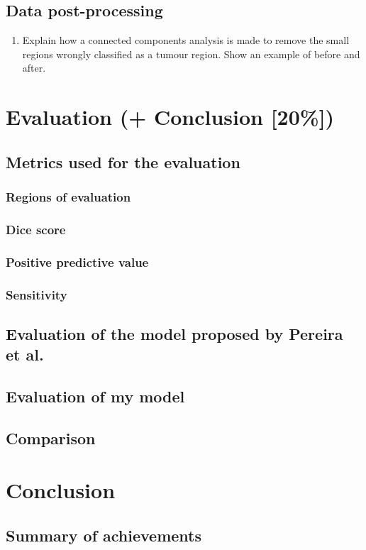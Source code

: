 \documentclass[12pt,a4paper,twoside,openright]{report}
\begin{document}
\section{Data post-processing}
\begin{enumerate}
	\item Explain how a connected components analysis is made to remove the small regions wrongly classified as a tumour region. Show an example of before and after.
\end{enumerate}
\chapter{Evaluation (+ Conclusion [20\%])}

\section{Metrics used for the evaluation}
\subsection{Regions of evaluation}
\subsection{Dice score}
\subsection{Positive predictive value}
\subsection{Sensitivity}

\section{Evaluation of the model proposed by Pereira et al.}
\section{Evaluation of my model}
\section{Comparison}

\chapter{Conclusion}
\section{Summary of achievements}
\end{document}

